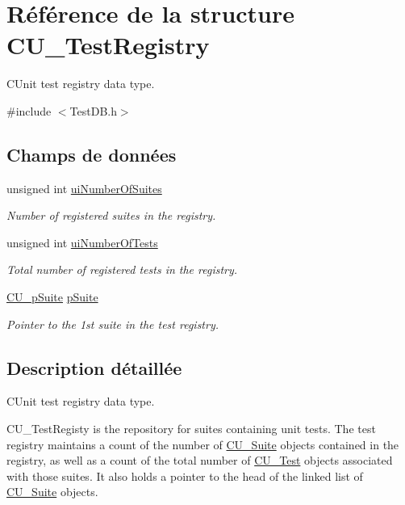 \hypertarget{structCU__TestRegistry}{\section{Référence de la structure C\-U\-\_\-\-Test\-Registry}
\label{structCU__TestRegistry}
}


C\-Unit test registry data type.  




{\ttfamily \#include $<$Test\-D\-B.\-h$>$}

\subsection*{Champs de données}
\begin{DoxyCompactItemize}
\item 
unsigned int \hyperlink{structCU__TestRegistry_aed4b67b99d6e0c875bcf08e924a82d68}{ui\-Number\-Of\-Suites}
\begin{DoxyCompactList}\small\item\em Number of registered suites in the registry. \end{DoxyCompactList}\item 
unsigned int \hyperlink{structCU__TestRegistry_a2ecdcc62de28e626fd55d8dc903df06c}{ui\-Number\-Of\-Tests}
\begin{DoxyCompactList}\small\item\em Total number of registered tests in the registry. \end{DoxyCompactList}\item 
\hyperlink{group__Framework_gaba832ae8b235f5e70d6a4ac9c3bb1219}{C\-U\-\_\-p\-Suite} \hyperlink{structCU__TestRegistry_ad58e6cd1dd4e6579eb255265593b9da8}{p\-Suite}
\begin{DoxyCompactList}\small\item\em Pointer to the 1st suite in the test registry. \end{DoxyCompactList}\end{DoxyCompactItemize}


\subsection{Description détaillée}
C\-Unit test registry data type. 

C\-U\-\_\-\-Test\-Registy is the repository for suites containing unit tests. The test registry maintains a count of the number of \hyperlink{structCU__Suite}{C\-U\-\_\-\-Suite} objects contained in the registry, as well as a count of the total number of \hyperlink{structCU__Test}{C\-U\-\_\-\-Test} objects associated with those suites. It also holds a pointer to the head of the linked list of \hyperlink{structCU__Suite}{C\-U\-\_\-\-Suite} objects. \par
\par


